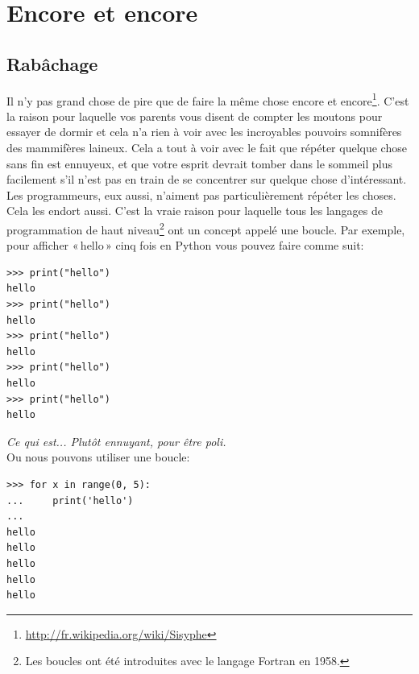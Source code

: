 



\chapter{Encore et encore}\label{ch:againandagain}
\section{Rabâchage}
Il n'y pas grand chose de pire que de faire la même chose encore et encore\footnote{\url{http://fr.wikipedia.org/wiki/Sisyphe}}.
C'est la raison pour laquelle vos parents vous disent de compter les moutons pour essayer de dormir et cela n'a rien à voir avec les incroyables pouvoirs somnifères des mammifères laineux. Cela  a tout à voir avec le fait que répéter quelque chose sans fin est ennuyeux, et que votre esprit devrait tomber dans le sommeil plus facilement s'il n'est pas en train de se concentrer sur quelque chose d'intéressant.\\


Les programmeurs, eux aussi, n'aiment pas particulièrement répéter les choses. Cela les endort aussi. C'est la vraie raison pour laquelle tous les langages de programmation de haut niveau\footnote{Les boucles ont été introduites avec le langage Fortran en 1958.} ont un concept appelé une boucle. Par exemple, pour afficher « hello »  cinq fois en Python vous pouvez faire comme suit:

\begin{Verbatim}[frame=single,rulecolor=\color{gray}, label=ne pas saisir]
>>> print("hello")
hello
>>> print("hello")
hello
>>> print("hello")
hello
>>> print("hello")
hello
>>> print("hello")
hello
\end{Verbatim}

\emph{Ce qui est... Plutôt ennuyant, pour être poli.}\\


Ou nous pouvons utiliser une boucle:

\begin{Verbatim}[frame=single,rulecolor=\color{green}, label=à taper avec attention]
>>> for x in range(0, 5):
...     print('hello')
...
hello
hello
hello
hello
hello
\end{Verbatim}

